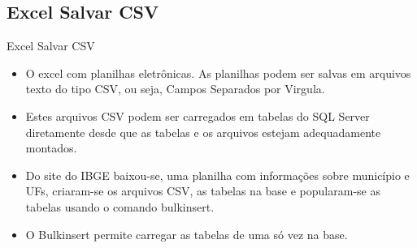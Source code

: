 	
	\subsection{Excel Salvar CSV}

	\begin{frame}
	
	\begin{CaixaModelo01}{Excel Salvar CSV }
	
	
	\begin{itemize}
		\item 	O excel com planilhas eletrônicas.
		As planilhas podem ser salvas em arquivos texto do tipo CSV,  ou seja, Campos Separados
		por Virgula.
		
		\item 	Estes arquivos CSV podem ser carregados em tabelas do SQL Server diretamente desde que as tabelas
		e os arquivos estejam adequadamente montados.
		
		\item 	Do site do IBGE baixou-se, uma planilha com informações sobre município e UFs, criaram-se os arquivos
		CSV, as tabelas na base e popularam-se as tabelas usando o comando bulkinsert.
		
		\item O Bulkinsert permite carregar as tabelas de uma só vez na base.
		
	\end{itemize}
	
%	
%	
%	


	\end{CaixaModelo01}
	
	\end{frame}